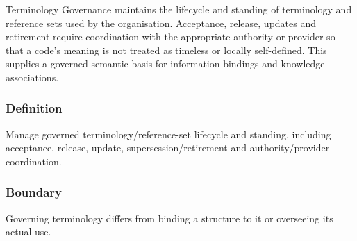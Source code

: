 Terminology Governance maintains the lifecycle and standing of terminology and reference sets used by the organisation. Acceptance, release, updates and retirement require coordination with the appropriate authority or provider so that a code's meaning is not treated as timeless or locally self-defined. This supplies a governed semantic basis for information bindings and knowledge associations.

\subsubsection*{Definition}

Manage governed terminology/\allowbreak{}reference-set lifecycle and standing, including acceptance, release, update, supersession/\allowbreak{}retirement and authority/\allowbreak{}provider coordination.

\subsubsection*{Boundary}

Governing terminology differs from binding a structure to it or overseeing its actual use.


